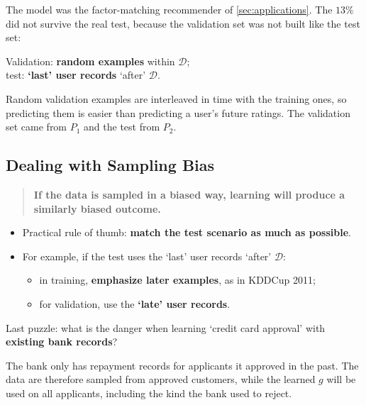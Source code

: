 The model was the factor-matching recommender of \autoref{sec:applications}.
The \(13\%\) did not survive the real test, because the validation set was
not built like the test set:

\begin{moral}
    Validation: \textbf{random examples} within \(\mathcal{D}\);\\
    test: \textbf{`last' user records} `after' \(\mathcal{D}\).
\end{moral}

Random validation examples are interleaved in time with the training ones,
so predicting them is easier than predicting a user's future ratings. The
validation set came from \(P_1\) and the test from \(P_2\).

\subsection{Dealing with Sampling Bias}

\begin{quote}
    \textbf{If the data is sampled in a biased way, learning will produce a
    similarly biased outcome.}
\end{quote}

\begin{itemize}
    \item Practical rule of thumb: \textbf{match the test scenario as much
        as possible}.
    \item For example, if the test uses the `last' user records `after'
        \(\mathcal{D}\):
        \begin{itemize}
            \item in training, \textbf{emphasize later examples}, as in
                KDDCup 2011;
            \item for validation, use the \textbf{`late' user records}.
        \end{itemize}
\end{itemize}

\begin{question}
    Last puzzle: what is the danger when learning `credit card approval' with
    \textbf{existing bank records}?
\end{question}

The bank only has repayment records for applicants it approved in the past.
The data are therefore sampled from approved customers, while the learned
\(g\) will be used on all applicants, including the kind the bank used to
reject.

